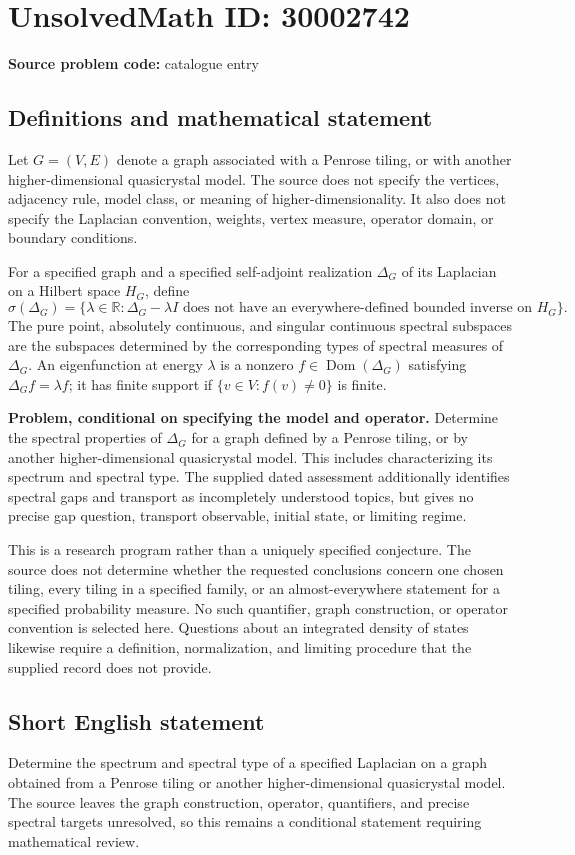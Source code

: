 \documentclass[11pt]{article}
\newcommand{\R}{\mathbb{R}}
\begin{document}
\section*{UnsolvedMath ID: 30002742}
\textbf{Source problem code:} catalogue entry
\subsection{Definitions and mathematical statement}
Let \(G=(V,E)\) denote a graph associated with a Penrose tiling, or with another higher-dimensional quasicrystal model. The source does not specify the vertices, adjacency rule, model class, or meaning of higher-dimensionality. It also does not specify the Laplacian convention, weights, vertex measure, operator domain, or boundary conditions.

For a specified graph and a specified self-adjoint realization \(\Delta_G\) of its Laplacian on a Hilbert space \(H_G\), define
\[
\sigma(\Delta_G)=\{\lambda\in\R:\Delta_G-\lambda I\text{ does not have an everywhere-defined bounded inverse on }H_G\}.
\]
The pure point, absolutely continuous, and singular continuous spectral subspaces are the subspaces determined by the corresponding types of spectral measures of \(\Delta_G\). An eigenfunction at energy \(\lambda\) is a nonzero \(f\in\operatorname{Dom}(\Delta_G)\) satisfying \(\Delta_G f=\lambda f\); it has finite support if \(\{v\in V:f(v)\ne0\}\) is finite.

\textbf{Problem, conditional on specifying the model and operator.} Determine the spectral properties of \(\Delta_G\) for a graph defined by a Penrose tiling, or by another higher-dimensional quasicrystal model. This includes characterizing its spectrum and spectral type. The supplied dated assessment additionally identifies spectral gaps and transport as incompletely understood topics, but gives no precise gap question, transport observable, initial state, or limiting regime.

This is a research program rather than a uniquely specified conjecture. The source does not determine whether the requested conclusions concern one chosen tiling, every tiling in a specified family, or an almost-everywhere statement for a specified probability measure. No such quantifier, graph construction, or operator convention is selected here. Questions about an integrated density of states likewise require a definition, normalization, and limiting procedure that the supplied record does not provide.
\subsection{Short English statement}
Determine the spectrum and spectral type of a specified Laplacian on a graph obtained from a Penrose tiling or another higher-dimensional quasicrystal model. The source leaves the graph construction, operator, quantifiers, and precise spectral targets unresolved, so this remains a conditional statement requiring mathematical review.
\end{document}

